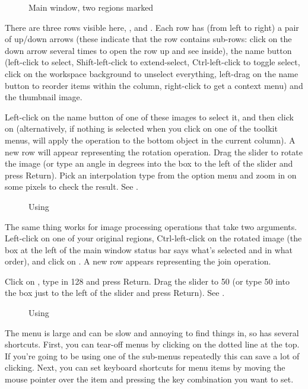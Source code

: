 \begin{figure}
\caption{Main window, two regions marked}
\end{figure}

There are three rows visible here, ,  and . Each row
has (from left to right) a pair of up/down arrows (these indicate that
the row contains sub-rows: click on the down arrow several times to
open the row up and see inside), the name button (left-click to select,
Shift-left-click to extend-select, Ctrl-left-click to toggle select, click
on the workspace background to unselect everything, left-drag on the name
button to reorder items within the column, right-click to get a context menu) 
and the thumbnail image.

Left-click on the name button of one of these images to select it, and
then click on 
(alternatively, if nothing is selected when you click on one of the toolkit
menus, \nip{} will apply the operation to the bottom object in the current
column). A new row will appear representing the rotation operation. Drag
the slider to rotate the image (or type an angle in degrees into the box
to the left of the slider and press Return). Pick an interpolation type from
the option menu and zoom in on some pixels to check the result. 
See .

\begin{figure}
\caption{Using }
\end{figure}

The same thing works for image processing operations that take two arguments.
Left-click on one of your original regions, Ctrl-left-click on the rotated
image (the box at the left of the main window status bar says what's selected
and in what order), and click on . A new row appears representing the join operation.

Click on , type in 128 and press Return. Drag the
 slider to 50 (or type 50 into the box just to the left of the
slider and press Return). See .

\begin{figure}
\caption{Using }
\end{figure}

The  menu is large and can be slow and annoying to find
things in, so \nip{} has several shortcuts. First, you can tear-off menus
by clicking on the dotted line at the top. If you're going to be using
one of the sub-menus repeatedly this can save a lot of clicking. Next,
you can set keyboard shortcuts for menu items by moving the mouse pointer
over the item and pressing the key combination you want to set. 

